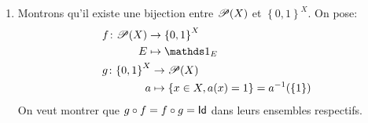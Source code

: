 {\begin{td-sol}[]
\begin{enumerate}
\begin{itemize}
                \item On utilise les lois de De Morgan pour simplifier les calculs:
                \begin{equation*}
                    \begin{aligned}
                        \one_{A\cup B} 
                        &= \one_{{\left({(A\cup B)}^{\color{red} C\color{black}}\right)}^{\color{red} C\color{black}}}\\
                        &= 1 - \one_{\comp{\left(A\cup B\right)}}\\
                        &= 1 - \one_{\comp A\cap\comp B}\\
                        &= 1 - \left(1 - \one_A\right)\left(1-\one_B\right)\\
                        &= 1 - \left(1 - \one_A - \one_B + \one_A\one_B\right)\\
                        &= \one_A + \one_B - \one_A\one_B
                    \end{aligned}
                \end{equation*}
            \end{itemize}

            \item Montrons qu'il existe une bijection entre \(\mathscr{P}(X)\) et \({\left\{0,1\right\}}^X\). On pose:
            \begin{equation*}
                \begin{aligned}
                    &\begin{aligned}
                        f\colon \scrP(X)
                        &\to {\left\{0,1\right\}}^X\\
                        E&\mapsto \one_E
                    \end{aligned}\\
                    &\begin{aligned}
                        g\colon{\left\{0,1\right\}}^X
                        &\to \scrP(X)\\
                        a&\mapsto \left\{x\in X,a(x)=1\right\}=a^{-1}(\{1\})
                    \end{aligned}
                \end{aligned}
            \end{equation*}
            On veut montrer que \(g\circ f=f\circ g = \operatorname{\mathsf{Id}}\) dans leurs ensembles respectifs.


\end{enumerate}
\end{td-sol}}
